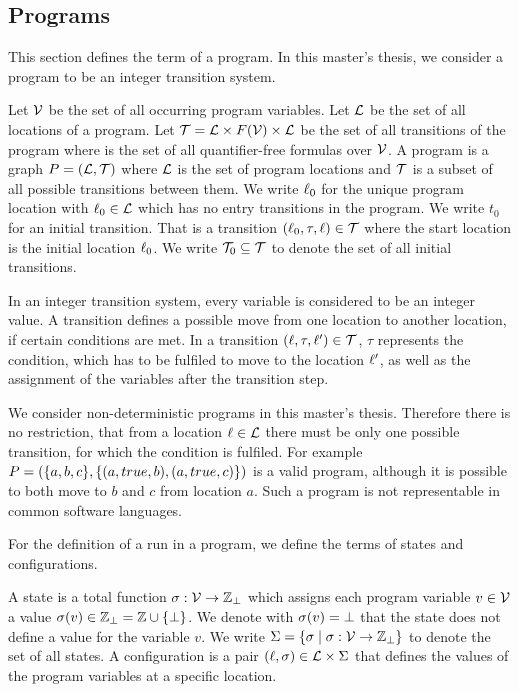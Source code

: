 \subsection{Programs}

This section defines the term of a program.
In this master's thesis, we consider a program to be an integer transition system.

\begin{definition}[Program] 
  Let $\mathcal{V}$ be the set of all occurring program variables.
  Let $\mathcal{L}$ be the set of all locations of a program.
  Let $\mathcal{T} = \mathcal{L} \times F(\mathcal{V}) \times \mathcal{L}$ be the set of all transitions of the program where  is the set of all quantifier-free formulas over $\mathcal{V}$.
  A program is a graph $P = (\mathcal{L}, \mathcal{T})$ where $\mathcal{L}$ is the set of program locations and $\mathcal{T}$ is a subset of all possible transitions between them.
  We write $\ell_0$ for the unique program location with $\ell_0 \in \mathcal{L}$ which has no entry transitions in the program.
  We write $t_0$ for an initial transition. That is a transition $(\ell_0, \tau, \ell) \in \mathcal{T}$ where the start location is the initial location $\ell_0$.
  We write $\mathcal{T}_0 \subseteq \mathcal{T}$ to denote the set of all initial transitions.
\end{definition}

In an integer transition system, every variable is considered to be an integer value.
A transition defines a possible move from one location to another location, if certain conditions are met.
In a transition $(\ell,\tau,\ell') \in \mathcal{T}$, $\tau$ represents the condition, which has to be fulfiled to move to the location $\ell'$, as well as the assignment of the variables after the transition step.

We consider non-deterministic programs in this master's thesis.
Therefore there is no restriction, that from a location $\ell \in \mathcal{L}$ there must be only one possible transition, for which the condition is fulfiled.
For example $P=(\lbrace a,b,c \rbrace,\lbrace (a,true,b),(a,true,c) \rbrace)$ is a valid program, although it is possible to both move to $b$ and $c$ from location $a$.
Such a program is not representable in common software languages.

For the definition of a run in a program, we define the terms of states and configurations.

\begin{definition}[Configuration] 
  A state is a total function $\sigma: \mathcal{V} \rightarrow \mathbb{Z}_\bot$ which assigns each program variable $v \in \mathcal{V}$ a value $\sigma(v) \in \mathbb{Z}_\bot = \mathbb{Z} \cup \lbrace \bot \rbrace$.
  We denote with $\sigma(v) = \bot$ that the state does not define a value for the variable $v$.
  We write $\Sigma = \lbrace  \sigma \mid \sigma: \mathcal{V} \rightarrow \mathbb{Z}_\bot \rbrace$ to denote the set of all states.
  A configuration is a pair $(\ell, \sigma) \in \mathcal{L} \times \Sigma$ that defines the values of the program variables at a specific location.
\end{definition}

